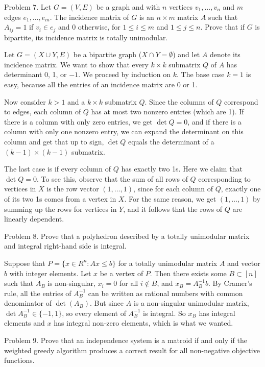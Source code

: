 \proclaim Problem 7. Let $G=(V,E)$ be a graph and with $n$ vertices $v_1,\ldots,v_n$ and $m$ edges $e_1,\ldots,e_m$. The incidence matrix of $G$ is an $n\times m$ matrix $A$ such that $A_{ij} = 1$ if $v_i\in e_j$ and 0 otherwise, for $1\leq i\leq m$ and $1\leq j\leq n$. Prove that if $G$ is bipartite, its incidence matrix is totally unimodular.

\proof Let $G=(X\cup Y, E)$ be a bipartite graph ($X\cap Y = \emptyset$) and let $A$ denote its incidence matrix. We want to show that every $k\times k$ submatrix $Q$ of $A$ has determinant 0, 1, or $-1$. We proceed by induction on $k$. The base case $k=1$ is easy, because all the entries of an incidence matrix are 0 or 1.

Now consider $k>1$ and a $k\times k$ submatrix $Q$. Since the columns of $Q$ correspond to edges, each column of $Q$ has at most two nonzero entries (which are 1). If there is a column with only zero entries, we get $\det Q = 0$, and if there is a column with only one nonzero entry, we can expand the determinant on this column and get that up to sign, $\det Q$ equals the determinant of a $(k-1)\times(k-1)$ submatrix.

The last case is if every column of $Q$ has exactly two 1s. Here we claim that $\det Q = 0$. To see this, observe that the sum of all rows of $Q$ corresponding to vertices in $X$ is the row vector $(1,\ldots,1)$, since for each column of $Q$, exactly one of its two 1s comes from a vertex in $X$. For the same reason, we get $(1,\ldots,1)$ by summing up the rows for vertices in $Y$, and it follows that the rows of $Q$ are linearly dependent.\slug

\proclaim Problem 8. Prove that a polyhedron described by a totally unimodular matrix and integral right-hand side is integral.

\proof Suppose that $P = \{x\in R^n : Ax\leq b\}$ for a totally unimodular matrix $A$ and vector $b$ with integer elements. Let $x$ be a vertex of $P$. Then there exists some $B\subset [n]$ such that $A_B$ is non-singular, $x_i = 0$ for all $i\notin B$, and $x_B = A_B^{-1}b$. By Cramer's rule, all the entries of $A_B^{-1}$ can be written as rational numbers with common denominator of $\det(A_B)$. But since $A$ is a non-singular unimodular matrix, $\det A_B^{-1} \in\{-1,1\}$, so every element of $A_B^{-1}$ is integral. So $x_B$ has integral elements and $x$ has integral non-zero elements, which is what we wanted.\slug

\proclaim Problem 9. Prove that an independence system is a matroid if and only if the weighted greedy algorithm produces a correct result for all non-negative objective functions.

